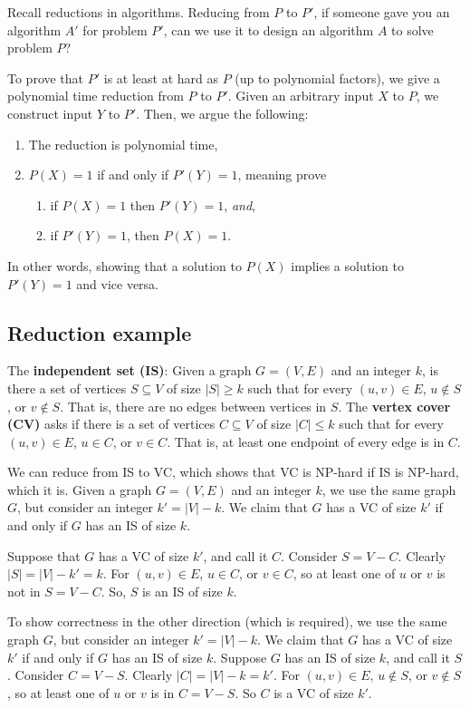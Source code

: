 \documentclass[titlepage, 12pt, leqno]{article}
\begin{document}
Recall reductions in algorithms. Reducing from $P$ to $P'$, if someone gave you
an algorithm $A'$ for problem $P'$, can we use it to design an algorithm $A$ to
solve problem $P$?

To prove that $P'$ is at least at hard as $P$ (up to polynomial factors), we 
give a polynomial time reduction from $P$ to $P'$. Given an arbitrary input $X$
to $P$, we construct input $Y$ to $P'$. Then, we argue the following: 
\begin{enumerate}
    \item The reduction is polynomial time,
    \item $P(X) = 1$ if and only if $P'(Y) = 1$, meaning prove
        \begin{enumerate}
            \item if $P(X) = 1$ then $P'(Y) = 1$, \textit{and},
            \item if $P'(Y) = 1$, then $P(X) = 1$.
        \end{enumerate}
\end{enumerate}
In other words, showing that a solution to $P(X)$ implies a solution to $P'(Y)
= 1$ and vice versa.

\subsection{Reduction example}
The \textbf{independent set (IS)}: Given a graph $G = (V,E)$ and an integer
$k$, is there a set of vertices $S \subseteq V$ of size $|S| \ge k$ such that
for every $(u,v) \in E$, $u \notin S$, or $v \notin S$. That is, there are no
edges between vertices in $S$. The \textbf{vertex cover (CV)} asks if there is a
set of vertices $C \subseteq V$ of size $|C| \le k$ such that for every $(u,v)
\in E$, $u \in C$, or $v \in C$. That is, at least one endpoint of every edge is
in $C$. 

We can reduce from IS to VC, which shows that VC is NP-hard if IS is NP-hard,
which it is. Given a graph $G=(V,E)$ and an integer $k$, we use the same graph
$G$, but consider an integer $k' = |V|-k$. We claim that $G$ has a VC of size
$k'$ if and only if $G$ has an IS of size $k$.

Suppose that $G$ has a VC of size $k'$, and call it $C$. Consider $S = V-C$.
Clearly $|S| = |V|-k' = k$. For $(u,v) \in E$, $u \in C$, or $v \in C$, so at
least one of $u$ or $v$ is not in $S = V-C$. So, $S$ is an IS of size $k$.

To show correctness in the other direction (which is required), we use the same
graph $G$, but consider an integer $k' = |V| -k$. We claim that $G$ has a VC of
size $k'$ if and only if $G$ has an IS of size $k$. Suppose $G$ has an IS of
size $k$, and call it $S$. Consider $C = V-S$. Clearly $|C| = |V|-k=k'$. For
$(u,v) \in  E$, $u \notin S$, or $v \notin S$, so at least one of $u$ or $v$ is
in $C=V-S$. So $C$ is a VC of size $k'$.
\end{document}
